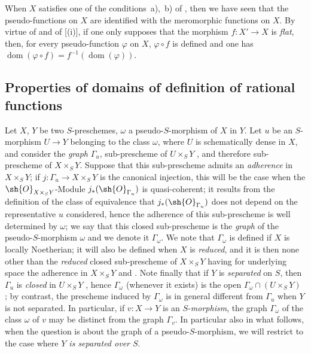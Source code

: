 \begin{remark}[20.3.13]
\label{IV.20.3.13}
When $X$ satisfies one of the conditions~a),~b) of , then we have seen  that the pseudo-functions on $X$ are identified with the meromorphic functions on $X$.
By virtue of  and of [(i)], if one only supposes that the morphism $f:X'\to X$ is \emph{flat}, then, for every pseudo-function $\varphi$ on $X$, $\varphi\circ f$ is defined and one has $\operatorname{dom}(\varphi\circ f)=f^{-1}(\operatorname{dom}(\varphi))$.
\end{remark}

\subsection{Properties of domains of definition of rational functions}
\label{IV.20.4}

\begin{env}[20.4.1]
\label{IV.20.4.1}
Let $X$, $Y$ be two $S$-preschemes, $\omega$ a pseudo-$S$-morphism of $X$ in $Y$.
Let $u$ be an $S$-morphism $U\to Y$ belonging to the class $\omega$, where $U$ is schematically dense in $X$, and consider the \emph{graph} $\Gamma_u$, sub-prescheme of $U\times_S Y$ , and therefore sub-prescheme of $X\times_S Y$.
Suppose that this sub-prescheme admits an \emph{adherence}  in $X\times_S Y$;
if $j:\Gamma_u\to X\times_S Y$ is the canonical injection, this will be the case when the $\sh{O}_{X\times_S Y}$-Module $j_*(\sh{O}_{\Gamma_u})$ is quasi-coherent;
it results from the definition of the class of equivalence  that $j_*(\sh{O}_{\Gamma_u})$ does not depend on the representative $u$ considered, hence the adherence of this sub-prescheme is well determined by $\omega$;
we say that this closed sub-prescheme is the \emph{graph} of the pseudo-$S$-morphism $\omega$ and we denote it $\Gamma_\omega$.
We note that $\Gamma_\omega$ is defined if $X$ is locally Noetherian;
it will also be defined when $X$ is \emph{reduced}, and it is then none other than the \emph{reduced} closed sub-prescheme of $X\times_S Y$ having for underlying space the adherence in $X\times_S Y$  and .
Note finally that if $Y$ is \emph{separated} on $S$, then $\Gamma_u$ is \emph{closed} in $U\times_S Y$ , hence $\Gamma_\omega$ (whenever it exists) is the open $\Gamma_\omega\cap(U\times_S Y)$ ;
by contrast, the prescheme induced by $\Gamma_\omega$ is in general different from $\Gamma_u$ when $Y$ is not separated.
In particular, if $v:X\to Y$ is an $S$-\emph{morphism}, the graph $\Gamma_\omega$ of the class $\omega$ of $v$ may be distinct from the graph $\Gamma_v$.
In particular also in what follows, when the question is about the graph of a pseudo-$S$-morphism, we will restrict to the case where \emph{$Y$ is separated over $S$}.
\end{env}

